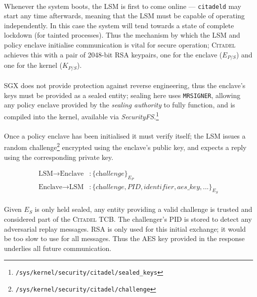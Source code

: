 \paragraph{} Whenever the system boots, the LSM is first to come online --- \texttt{citadeld} may start any time afterwards, meaning that the LSM must be capable of operating independently. In this case the system will tend towards a state of complete lockdown (for tainted processes). Thus the mechanism by which the LSM and policy enclave initialise communication is vital for secure operation; \textsc{Citadel} achieves this with a pair of 2048-bit RSA keypairs, one for the enclave ($E_{P/S}$) and one for the kernel ($K_{P/S}$).

\paragraph{} SGX does not provide protection against reverse engineering, thus the enclave's keys must be provided as a sealed entity; sealing here uses \texttt{MRSIGNER}, allowing any policy enclave provided by the \textit{sealing authority} to fully function, and is compiled into the kernel, available via \textit{SecurityFS}.\footnote{\texttt{/sys/kernel/security/citadel/sealed\_keys}}

\paragraph{} Once a policy enclave has been initialised it must verify itself; the LSM issues a random challenge\footnote{\texttt{/sys/kernel/security/citadel/challenge}} encrypted using the enclave's public key, and expects a reply using the corresponding private key.

\vspace{-5mm}
\begin{align*}
    \text{LSM} \rightarrow \text{Enclave} &: \{\textit{challenge}\}_{E_{P}} \\
    \text{Enclave} \rightarrow \text{LSM} &: \{\textit{challenge}, \textit{PID}, \textit{identifier}, \textit{aes\_key}, ...\}_{E_{S}}
\end{align*}

\paragraph{} Given $E_S$ is only held sealed, any entity providing a valid challenge is trusted and considered part of the \textsc{Citadel} TCB. The challenger's PID is stored to detect any adversarial replay messages. RSA is only used for this initial exchange; it would be too slow to use for all messages. Thus the AES key provided in the response underlies all future communication.

